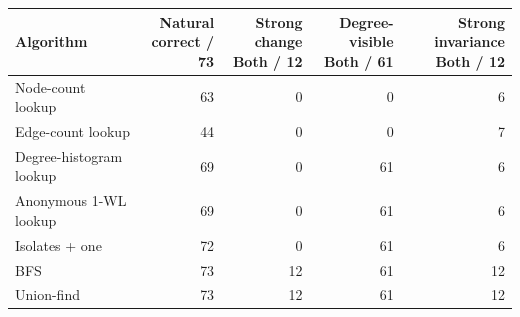\begin{tabular}{@{}lrrrr@{}}
\toprule
Algorithm & \shortstack{Natural\\correct / 73} & \shortstack{Strong change\\Both / 12} & \shortstack{Degree-visible\\Both / 61} & \shortstack{Strong invariance\\Both / 12}\\
\midrule
Node-count lookup & 63 & 0 & 0 & 6\\
Edge-count lookup & 44 & 0 & 0 & 7\\
Degree-histogram lookup & 69 & 0 & 61 & 6\\
Anonymous 1-WL lookup & 69 & 0 & 61 & 6\\
Isolates + one & 72 & 0 & 61 & 6\\
BFS & 73 & 12 & 61 & 12\\
Union-find & 73 & 12 & 61 & 12\\
\bottomrule
\end{tabular}
